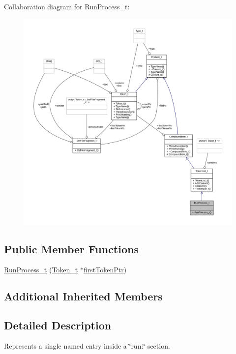 Collaboration diagram for Run\+Process\+\_\+t\+:
\nopagebreak
\begin{figure}[H]
\begin{center}
\leavevmode
\includegraphics[width=350pt]{struct_run_process__t__coll__graph}
\end{center}
\end{figure}
\subsection*{Public Member Functions}
\begin{DoxyCompactItemize}
\item 
\hyperlink{struct_run_process__t_a400de05f68134d0e1beb4a054b2052a3}{Run\+Process\+\_\+t} (\hyperlink{struct_token__t}{Token\+\_\+t} $\ast$\hyperlink{struct_compound_item__t_a4d95dc788120f627e332491589d20c5c}{first\+Token\+Ptr})
\end{DoxyCompactItemize}
\subsection*{Additional Inherited Members}


\subsection{Detailed Description}
Represents a single named entry inside a \char`\"{}run\+:\char`\"{} section. 


